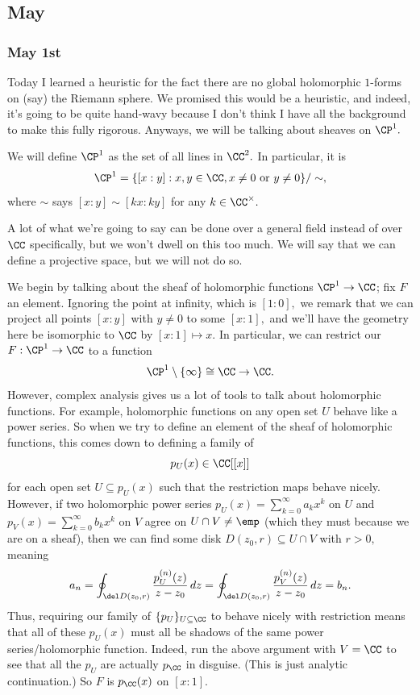 \subsection{May}







\subsubsection{May 1st}
Today I learned a heuristic for the fact there are no global holomorphic $1$-forms on (say) the Riemann sphere. We promised this would be a heuristic, and indeed, it's going to be quite hand-wavy because I don't think I have all the background to make this fully rigorous. Anyways, we will be talking about sheaves on $\CP^1.$
\begin{definition}
    We will define $\CP^1$ as the set of all lines in $\CC^2.$ In particular, it is
    \[\CP^1=\{[x:y]:x,y\in\CC,x\ne0\text{ or }y\ne0\}/\sim,\]
    where $\sim$ says $[x:y]\sim[kx:ky]$ for any $k\in\CC^\times.$
\end{definition}
A lot of what we're going to say can be done over a general field instead of over $\CC$ specifically, but we won't dwell on this too much. We will say that we can define a projective space, but we will not do so.

We begin by talking about the sheaf of holomorphic functions $\CP^1\to\CC$; fix $F$ an element. Ignoring the point at infinity, which is $[1:0],$ we remark that we can project all points $[x:y]$ with $y\ne0$ to some $[x:1],$ and we'll have the geometry here be isomorphic to $\CC$ by $[x:1]\mapsto x.$ In particular, we can restrict our $F:\CP^1\to\CC$ to a function
\[\CP^1\setminus\{\infty\}\cong\CC\to\CC.\]
However, complex analysis gives us a lot of tools to talk about holomorphic functions. For example, holomorphic functions on any open set $U$ behave like a power series. So when we try to define an element of the sheaf of holomorphic functions, this comes down to defining a family of
\[p_U(x)\in\CC[[x]]\]
for each open set $U\subseteq p_U(x)$ such that the restriction maps behave nicely. However, if two holomorphic power series $p_U(x)=\sum_{k=0}^\infty a_kx^k$ on $U$ and $p_V(x)=\sum_{k=0}^\infty b_kx^k$ on $V$ agree on $U\cap V\ne\emp$ (which they must because we are on a sheaf), then we can find some disk $D(z_0,r)\subseteq U\cap V$ with $r>0,$ meaning
\[a_n=\oint_{\del D(z_0,r)}\frac{p_U^{(n)}(z)}{z-z_0}\,dz=\oint_{\del D(z_0,r)}\frac{p_V^{(n)}(z)}{z-z_0}\,dz=b_n.\]
Thus, requiring our family of $\{p_U\}_{U\subseteq\CC}$ to behave nicely with restriction means that all of these $p_U(x)$ must all be shadows of the same power series/holomorphic function. Indeed, run the above argument with $V=\CC$ to see that all the $p_U$ are actually $p_\CC$ in disguise. (This is just analytic continuation.) So $F$ is $p_\CC(x)$ on $[x:1].$


